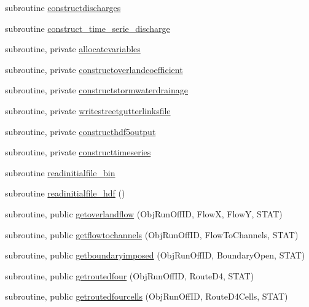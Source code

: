 \begin{DoxyCompactItemize}
\item 
subroutine \mbox{\hyperlink{namespacemodulerunoff_aaa760a0a33dfff4681a831fe25d1b075}{constructdischarges}}
\item 
subroutine \mbox{\hyperlink{namespacemodulerunoff_a7d3fe3f8c8fecb1a73f35d1963f7b2b5}{construct\+\_\+time\+\_\+serie\+\_\+discharge}}
\item 
subroutine, private \mbox{\hyperlink{namespacemodulerunoff_a3a007b7a4dcf19d2d269172e36d996de}{allocatevariables}}
\item 
subroutine, private \mbox{\hyperlink{namespacemodulerunoff_a9750562ffa96a2b097ee6cfb440440ec}{constructoverlandcoefficient}}
\item 
subroutine, private \mbox{\hyperlink{namespacemodulerunoff_a03335615cccffdf4fcbc7979c2e2b299}{constructstormwaterdrainage}}
\item 
subroutine, private \mbox{\hyperlink{namespacemodulerunoff_ab6d245038f3fab90baee9dcfb7ddc30e}{writestreetgutterlinksfile}}
\item 
subroutine, private \mbox{\hyperlink{namespacemodulerunoff_a2cafb8c9efc342200a6ec558a7eeb90d}{constructhdf5output}}
\item 
subroutine, private \mbox{\hyperlink{namespacemodulerunoff_a38585735a1deed54aec387488350fd0d}{constructtimeseries}}
\item 
subroutine \mbox{\hyperlink{namespacemodulerunoff_abc7533c7bdb5fde4b69ad3d1db1b0b1a}{readinitialfile\+\_\+bin}}
\item 
subroutine \mbox{\hyperlink{namespacemodulerunoff_a0076542117101ad74013563790aca394}{readinitialfile\+\_\+hdf}} ()
\item 
subroutine, public \mbox{\hyperlink{namespacemodulerunoff_a4d5da3ce5f5efddf1d2957ea8e1e1791}{getoverlandflow}} (Obj\+Run\+Off\+ID, FlowX, FlowY, S\+T\+AT)
\item 
subroutine, public \mbox{\hyperlink{namespacemodulerunoff_af164eb766650a303ad4fbe9de7bcb541}{getflowtochannels}} (Obj\+Run\+Off\+ID, Flow\+To\+Channels, S\+T\+AT)
\item 
subroutine, public \mbox{\hyperlink{namespacemodulerunoff_a721381be9f2b0f07b9349c1a1df63001}{getboundaryimposed}} (Obj\+Run\+Off\+ID, Boundary\+Open, S\+T\+AT)
\item 
subroutine, public \mbox{\hyperlink{namespacemodulerunoff_a092094d64e7a0ff361f536ab75f67317}{getroutedfour}} (Obj\+Run\+Off\+ID, Route\+D4, S\+T\+AT)
\item 
subroutine, public \mbox{\hyperlink{namespacemodulerunoff_ad1eea51d0c7cb95a4e235e18dad99861}{getroutedfourcells}} (Obj\+Run\+Off\+ID, Route\+D4\+Cells, S\+T\+AT)

\end{DoxyCompactItemize}

